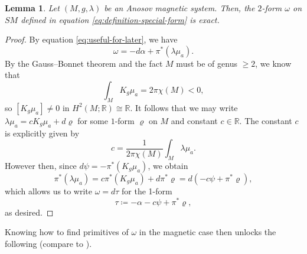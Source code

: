 \documentclass[reqno,12pt,letterpaper]{amsart}
\newtheorem{lemma}[proposition]{Lemma}
\theoremstyle{definition}
\theoremstyle{remark}
\theoremstyle{definition}
\numberwithin{equation}{section}
\newcommand{\R}{\mathbb{R}}
\begin{document}
\begin{lemma}
Let $(M, g, \lambda)$ be an Anosov magnetic system. Then, the $2$-form $\omega$ on $SM$ defined in equation \eqref{eq:definition-special-form} is exact.
\end{lemma}
\begin{proof}
By equation \eqref{eq:useful-for-later}, we have
$$\omega = -d\alpha + \pi^*(\lambda\mu_a).$$
By the Gauss--Bonnet theorem and the fact $M$ must be of genus $\geq 2$, we know that
$$\int_{M}K_g \mu_a = 2\pi \chi(M)< 0,$$
so $[K_g \mu_a]\neq 0$ in $H^2(M; \R)\cong \R$. It follows that we may write $\lambda\mu_a =c K_g \mu_a + d\varrho$ for some $1$-form $\varrho$ on $M$ and constant $c\in \R$. The constant $c$ is explicitly given by
\begin{equation}\label{eq:constant-c}
c=\dfrac{1}{2\pi \chi(M)}\int_M \lambda\mu_a.
\end{equation} 
However then, since $d\psi = - \pi^*(K_g\mu_a)$, we obtain
\begin{equation*}
\pi^*(\lambda  \mu_a)=c \pi^*(K_g \mu_a) + d\pi^*\varrho=d(-c\psi +\pi^*\varrho),
\end{equation*}
which allows us to write $\omega = d\tau$ for the 1-form
\begin{equation}\label{eq:primitive}
\tau \coloneqq-\alpha-c\psi +\pi^*\varrho,
\end{equation}
as desired.
\end{proof}

Knowing how to find primitives of $\omega$ in the magnetic case then unlocks the following (compare to \cite[Lemma 4.1]{paternain06}).
\end{document}
